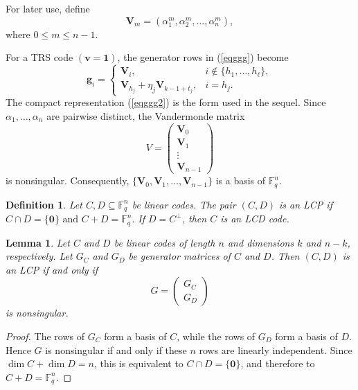 \documentclass[12pt,draftcls,journal,onecolumn]{IEEEtran}
\newtheorem{lemma}[theorem]{Lemma}
\newtheorem{definition}[theorem]{Definition}
\newcommand{\F}{{\mathbb{F}}}
\begin{document}
For later use, define
\[
\mathbf{V}_m
=
(\alpha_1^m,\alpha_2^m,\ldots,\alpha_n^m),
\]
\(
\text{where } 0\le m\le n-1.
\)

For a TRS code \((\boldsymbol{v}=\mathbf{1})\), the generator rows in (\ref{eqggg}) become
\begin{equation}\label{eqggg2}
\boldsymbol{g}_i=
\begin{cases}
\mathbf{V}_i, & i\notin\{h_1,\ldots,h_\ell\},\\
\mathbf{V}_{h_j}+\eta_j\mathbf{V}_{k-1+t_j}, & i=h_j.
\end{cases}
\end{equation}
The compact representation (\ref{eqggg2}) is the form used in the sequel. Since $\alpha_1,\ldots,\alpha_n$ are pairwise distinct, the Vandermonde matrix
\[
V=
\begin{pmatrix}
\mathbf{V}_0\\
\mathbf{V}_1\\
\vdots\\
\mathbf{V}_{n-1}
\end{pmatrix}
\]
is nonsingular. Consequently,
\(
\{\mathbf{V}_0,\mathbf{V}_1,\ldots,\mathbf{V}_{n-1}\}
\)
is a basis of $\F_q^n$.

\begin{definition}
Let $C,D\subseteq\F_q^n$ be linear codes. The pair $(C,D)$ is an LCP if
\(
C\cap D=\{\mathbf{0}\} \text{ and } C+D=\F_q^n.
\)
If $D=C^\perp$, then $C$ is an LCD code.
\end{definition}

\begin{lemma}\label{eq:10821}
Let $C$ and $D$ be linear codes of length $n$ and dimensions $k$ and $n-k$, respectively. Let $G_C$ and $G_D$ be generator matrices of $C$ and $D$. Then $(C,D)$ is an LCP if and only if
\[
G=
\begin{pmatrix}
G_C\\
G_D
\end{pmatrix}
\]
is nonsingular.
\end{lemma}

\begin{proof}
The rows of $G_C$ form a basis of $C$, while the rows of $G_D$ form a basis of $D$. Hence $G$ is nonsingular if and only if these $n$ rows are linearly independent. Since $\dim C+\dim D=n$, this is equivalent to $C\cap D=\{\mathbf{0}\}$, and therefore to $C+D=\F_q^n$.
\end{proof}
\end{document}
